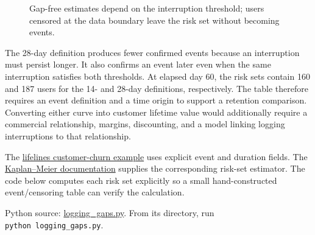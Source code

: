 \begin{figure}[htbp]
\centering

\caption{Gap-free estimates depend on the interruption threshold; users censored at the data boundary leave the risk set without becoming events.}\label{fig:M04_logging_survival}
\end{figure}

The 28-day definition produces fewer confirmed events because an
interruption must persist longer. It also confirms an event later even
when the same interruption satisfies both thresholds. At elapsed day 60,
the risk sets contain 160 and 187 users for the 14- and 28-day
definitions, respectively. The table therefore requires an event
definition and a time origin to support a retention comparison.
Converting either curve into customer lifetime value would additionally
require a commercial relationship, margins, discounting, and a model
linking logging interruptions to that relationship.

The
\href{https://github.com/CamDavidsonPilon/lifelines/blob/master/examples/Customer\%20Churn.ipynb}{lifelines
customer-churn example} uses explicit event and duration fields. The
\href{https://lifelines.readthedocs.io/en/latest/Survival\%20analysis\%20with\%20lifelines.html}{Kaplan--Meier
documentation} supplies the corresponding risk-set estimator. The code
below computes each risk set explicitly so a small hand-constructed
event/censoring table can verify the calculation.

\FloatBarrier
{}
Python source:
\href{../03_Data_and_Code/mHealth/recurring_examples/logging_gaps.py}{logging\_gaps.py}.
From its directory, run \texttt{python\ logging\_gaps.py}.

